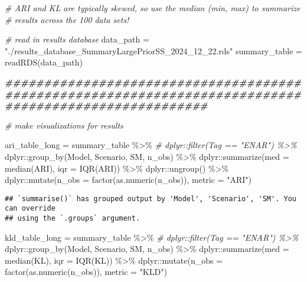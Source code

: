 \documentclass[
]{article}
\newenvironment{Shaded}{\begin{snugshade}}{\end{snugshade}}
\newcommand{\AttributeTok}[1]{\textcolor[rgb]{0.77,0.63,0.00}{#1}}
\newcommand{\CommentTok}[1]{\textcolor[rgb]{0.56,0.35,0.01}{\textit{#1}}}
\newcommand{\DocumentationTok}[1]{\textcolor[rgb]{0.56,0.35,0.01}{\textbf{\textit{#1}}}}
\newcommand{\FunctionTok}[1]{\textcolor[rgb]{0.00,0.00,0.00}{#1}}
\newcommand{\NormalTok}[1]{#1}
\newcommand{\OtherTok}[1]{\textcolor[rgb]{0.56,0.35,0.01}{#1}}
\newcommand{\SpecialCharTok}[1]{\textcolor[rgb]{0.00,0.00,0.00}{#1}}
\newcommand{\StringTok}[1]{\textcolor[rgb]{0.31,0.60,0.02}{#1}}
\begin{document}
\begin{Shaded}
\begin{Highlighting}[]
\CommentTok{\# ARI and KL are typically skewed, so use the median (min, max) to summarize}
\CommentTok{\# results across the 100 data sets!}

\CommentTok{\# read in results database}
\NormalTok{data\_path }\OtherTok{=} \StringTok{"./results\_database\_SummaryLargePriorSS\_2024\_12\_22.rds"}
\NormalTok{summary\_table }\OtherTok{=} \FunctionTok{readRDS}\NormalTok{(data\_path)}

\DocumentationTok{\#\#\#\#\#\#\#\#\#\#\#\#\#\#\#\#\#\#\#\#\#\#\#\#\#\#\#\#\#\#\#\#\#\#\#\#\#\#\#\#\#\#\#\#\#\#\#\#\#\#\#\#\#\#\#\#\#\#\#\#\#\#\#\#\#\#\#\#\#\#\#\#\#\#\#\#\#\#\#\#\#\#\#\#\#\#\#\#\#\#\#\#\#\#\#\#\#\#\#\#\#\#}

\CommentTok{\# make visualizations for results}

\NormalTok{ari\_table\_long }\OtherTok{=}\NormalTok{ summary\_table }\SpecialCharTok{\%\textgreater{}\%} 
  \CommentTok{\# dplyr::filter(Tag == "ENAR") \%\textgreater{}\%}
\NormalTok{  dplyr}\SpecialCharTok{::}\FunctionTok{group\_by}\NormalTok{(Model, Scenario, SM, n\_obs) }\SpecialCharTok{\%\textgreater{}\%}
\NormalTok{  dplyr}\SpecialCharTok{::}\FunctionTok{summarize}\NormalTok{(}\AttributeTok{med =} \FunctionTok{median}\NormalTok{(ARI), }\AttributeTok{iqr =} \FunctionTok{IQR}\NormalTok{(ARI)) }\SpecialCharTok{\%\textgreater{}\%}
\NormalTok{  dplyr}\SpecialCharTok{::}\FunctionTok{ungroup}\NormalTok{() }\SpecialCharTok{\%\textgreater{}\%}
\NormalTok{  dplyr}\SpecialCharTok{::}\FunctionTok{mutate}\NormalTok{(}\AttributeTok{n\_obs =} \FunctionTok{factor}\NormalTok{(}\FunctionTok{as.numeric}\NormalTok{(n\_obs)), }\AttributeTok{metric =} \StringTok{"ARI"}\NormalTok{)}
\end{Highlighting}
\end{Shaded}

\begin{verbatim}
## `summarise()` has grouped output by 'Model', 'Scenario', 'SM'. You can override
## using the `.groups` argument.
\end{verbatim}

\begin{Shaded}
\begin{Highlighting}[]
\NormalTok{kld\_table\_long }\OtherTok{=}\NormalTok{ summary\_table }\SpecialCharTok{\%\textgreater{}\%} 
  \CommentTok{\# dplyr::filter(Tag == "ENAR") \%\textgreater{}\%}
\NormalTok{  dplyr}\SpecialCharTok{::}\FunctionTok{group\_by}\NormalTok{(Model, Scenario, SM, n\_obs) }\SpecialCharTok{\%\textgreater{}\%}
\NormalTok{  dplyr}\SpecialCharTok{::}\FunctionTok{summarize}\NormalTok{(}\AttributeTok{med =} \FunctionTok{median}\NormalTok{(KL), }\AttributeTok{iqr =} \FunctionTok{IQR}\NormalTok{(KL)) }\SpecialCharTok{\%\textgreater{}\%}
\NormalTok{  dplyr}\SpecialCharTok{::}\FunctionTok{mutate}\NormalTok{(}\AttributeTok{n\_obs =} \FunctionTok{factor}\NormalTok{(}\FunctionTok{as.numeric}\NormalTok{(n\_obs)), }\AttributeTok{metric =} \StringTok{"KLD"}\NormalTok{)}
\end{Highlighting}
\end{Shaded}
\end{document}
